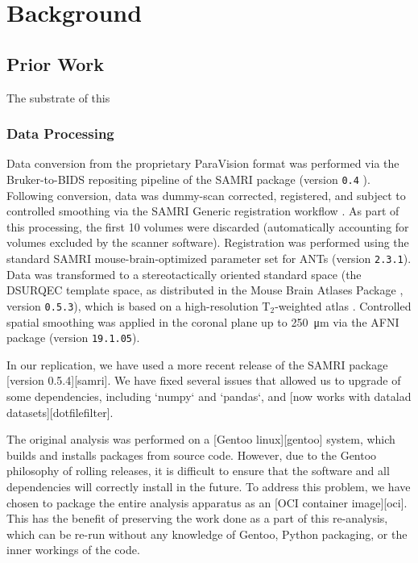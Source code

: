 \section{Background}

\subsection{Prior Work}

The substrate of this

\subsubsection{Data Processing}

Data conversion from the proprietary ParaVision format was performed via the Bruker-to-BIDS repositing pipeline \supercite{aowsis} of the SAMRI package (version \textcolor{mg}{\texttt{0.4}} \supercite{samri}).
Following conversion, data was dummy-scan corrected, registered, and subject to controlled smoothing via the SAMRI Generic registration workflow \supercite{irsabi}.
As part of this processing, the first 10 volumes were discarded (automatically accounting for volumes excluded by the scanner software).
Registration was performed using the standard SAMRI mouse-brain-optimized parameter set for ANTs \supercite{ants} (version \textcolor{mg}{\texttt{2.3.1}}).
Data was transformed to a stereotactically oriented standard space (the DSURQEC template space, as distributed in the Mouse Brain Atlases Package \supercite{atlases_generator}, version \textcolor{mg}{\texttt{0.5.3}}), which is based on a high-resolution $\mathrm{T_2}$-weighted atlas \supercite{dsu1}.
Controlled spatial smoothing was applied in the coronal plane up to \SI{250}{\micro\meter} via the AFNI package \supercite{afni} (version \textcolor{mg}{\texttt{19.1.05}}).

In our replication, we have used a more recent release of the SAMRI package [version 0.5.4][samri]. We have fixed several issues that allowed us to upgrade of some dependencies, including `numpy` and `pandas`, and [now works with datalad datasets][dotfilefilter].



The original analysis was performed on a [Gentoo linux][gentoo] system,
which builds and installs packages from source code. However, due to the 
Gentoo philosophy of rolling releases, it is difficult to ensure that
the software and all dependencies will correctly install in the future.
To address this problem, we have chosen to package the entire analysis
apparatus as an [OCI container image][oci]. This has the benefit of
preserving the work done as a part of this re-analysis, which can be
re-run without any knowledge of Gentoo, Python packaging, or the inner
workings of the code.

